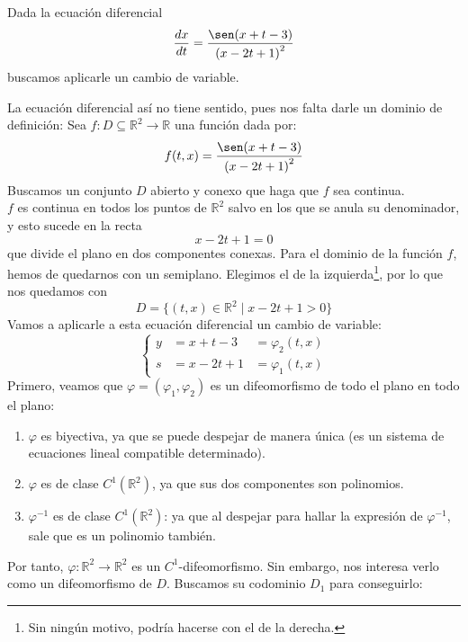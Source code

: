 \begin{ejemplo}
    Dada la ecuación diferencial
    \begin{equation*}
        \dfrac{dx}{dt} = \dfrac{\sen(x+t-3)}{{(x-2t+1)}^{2}}
    \end{equation*}
    buscamos aplicarle un cambio de variable.

    La ecuación diferencial así no tiene sentido, pues nos falta darle un dominio de definición: Sea $f:D\subseteq \mathbb{R}^2\rightarrow\mathbb{R}$ una función dada por:
    \begin{equation*}
        f(t,x) = \dfrac{\sen(x+t-3)}{{(x-2t+1)}^{2}}
    \end{equation*}
    Buscamos un conjunto $D$ abierto y conexo que haga que $f$ sea continua.\\

    $f$ es continua en todos los puntos de $\mathbb{R}^2$ salvo en los que se anula su denominador, y esto sucede en la recta
    \begin{equation*}
        x-2t+1= 0
    \end{equation*}
    que divide el plano en dos componentes conexas. Para el dominio de la función $f$, hemos de quedarnos con un semiplano. Elegimos el de la izquierda\footnote{Sin ningún motivo, podría hacerse con el de la derecha.}, por lo que nos quedamos con
    \begin{equation*}
        D = \{(t,x)\in \mathbb{R}^2 \mid x -2t+1>0 \}
    \end{equation*}
    Vamos a aplicarle a esta ecuación diferencial un cambio de variable:
    \begin{equation*}
        \left\{\begin{array}{rll}
            y &= x+t-3 &= \varphi_2(t,x) \\
            s &= x-2t+1 &= \varphi_1(t,x)
        \end{array}\right.
    \end{equation*}
    Primero, veamos que $\varphi = (\varphi_1,\varphi_2)$ es un difeomorfismo de todo el plano en todo el plano:
    \begin{enumerate}
        \item $\varphi$ es biyectiva, ya que se puede despejar de manera única (es un sistema de ecuaciones lineal compatible determinado).
        \item $\varphi$ es de clase $C^1(\mathbb{R}^2)$, ya que sus dos componentes son polinomios.
        \item $\varphi^{-1}$ es de clase $C^1(\mathbb{R}^2)$: ya que al despejar para hallar la expresión de $\varphi^{-1}$, sale que es un polinomio también.
    \end{enumerate}
    Por tanto, $\varphi:\mathbb{R}^2\rightarrow\mathbb{R}^2$ es un $C^1$-difeomorfismo. Sin embargo, nos interesa verlo como un difeomorfismo de $D$. Buscamos su codominio $D_1$ para conseguirlo:\\


\end{ejemplo}
